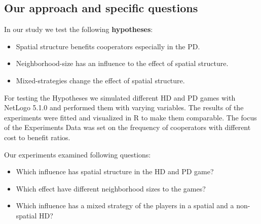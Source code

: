 \subsection{Our approach and specific questions}

In our study we test the following \textbf{hypotheses}: 

\begin{itemize}
\item Spatial structure benefits cooperators especially in the PD.
\item Neighborhood-size has an influence to the effect of spatial structure.
\item Mixed-strategies change the effect of spatial structure.
\end{itemize}

For testing the Hypotheses we simulated different HD and PD games with NetLogo 5.1.0 \citep{Wilensky1999} and performed them with varying variables. The results of the experiments were fitted and visualized in R \citep{R} to make them comparable. The focus of the Experiments Data was set on the frequency of cooperators with different cost to benefit ratios.

Our experiments examined following questions:
\begin{itemize}
\item Which influence has spatial structure in the HD and PD game?
\item Which effect have different neighborhood sizes to the games?
\item Which influence has a mixed strategy of the players in a spatial and a non-spatial HD?
\end{itemize}
